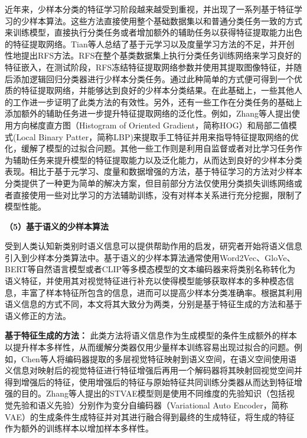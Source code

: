 近年来，少样本分类的特征学习阶段越来越受到重视，并出现了一系列基于特征学习的少样本算法\cite{RFS,chencloser, dhillon2019baseline, HandCrafted, IER, PAL, Spatial, FSLwCL, SSLforFSL, DeepBDC}。这些方法直接使用整个基础数据集以和普通分类任务一致的方式来训练模型，直接执行分类任务或者增加额外的辅助任务以获得特征提取能力出色的特征提取网络。Tian等人\cite{RFS}总结了基于元学习以及度量学习方法的不足，并开创性地提出RFS方法。RFS在整个基类数据集上执行分类任务训练网络来学习良好的特征嵌入，在测试阶段，RFS冻结特征提取网络参数并使用其提取图像特征，并随后添加逻辑回归分类器进行少样本分类任务。通过此种简单的方式便可得到一个优质的特征提取网络，并能够达到良好的少样本分类结果。在此基础上，一些其他人的工作\cite{chencloser, dhillon2019baseline}进一步证明了此类方法的有效性。另外，还有一些工作在分类任务的基础上添加额外的辅助任务进一步提升特征提取网络的泛化性。例如，Zhang等人\cite{HandCrafted}提出使用方向梯度直方图（Histogram of Oriented Gradient，简称HOG）和局部二值模式(Local Binary Patter，简称LBP)来提取手工特征并用来指导特征提取网络的优化，缓解了模型的过拟合问题。其他一些工作\cite{IER, PAL, Spatial, FSLwCL, SSLforFSL, DeepBDC}则是利用自监督或者对比学习任务作为辅助任务来提升模型的特征提取能力以及泛化能力，从而达到良好的少样本分类表现。相比于基于元学习、度量和数据增强的方法，基于特征学习的方法对少样本分类提供了一种更为简单的解决方案，但目前部分方法仅使用分类损失训练网络或者直接使用一些对比学习的方法辅助训练，没有对样本关系进行充分挖掘，限制了模型性能。

\textbf{（5）基于语义的少样本算法}

受到人类认知新类别时语义信息可以提供帮助作用的启发，研究者开始将语义信息引入到少样本分类算法中。基于语义的少样本算法通常使用Word2Vec\cite{Word2Vec}、GloVe\cite{GloVe}、BERT\cite{Bert}等自然语言模型或者CLIP\cite{Clip}等多模态模型的文本编码器来将类别名称转化为语义特征，并使用其对视觉特征进行补充以使得模型能够获取样本的多种模态信息，丰富了样本特征所包含的信息，进而可以提高少样本分类准确率。根据其利用语义信息的方式不同，本文将其大致分为两类，分别是基于特征生成的方法和基于语义修正的方法。

\textbf{基于特征生成的方法：} 此类方法将语义信息作为生成模型的条件生成额外的样本以提升样本多样性，从而缓解分类器仅用少量样本训练容易出现过拟合的问题。例如，Chen等人\cite{DualTriNet}将编码器提取的多层视觉特征映射到语义空间，在语义空间使用语义信息对映射后的视觉特征进行特征增强后再用一个解码器将其映射回视觉空间并得到增强后的特征，使用增强后的特征与原始特征共同训练分类器从而达到特征增强的目的。Zhang等人\cite{STVAE}提出的STVAE模型则是使用不同维度的先验知识（包括视觉先验和语义先验）分别作为变分自编码器（Variational Auto Encoder，简称VAE）的生成条件生成特征并对其进行融合得到最终的生成特征，将生成的特征作为额外的训练样本以增加样本多样性。

